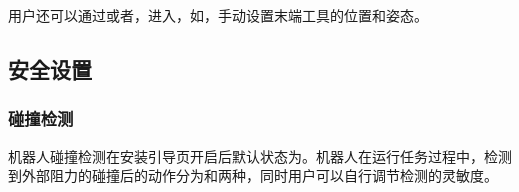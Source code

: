 用户还可以通过或者，进入，如，手动设置末端工具的位置和姿态。

\subsection{安全设置}
\subsubsection{碰撞检测}
机器人碰撞检测在安装引导页开启后默认状态为。机器人在运行任务过程中，检测到外部阻力的碰撞后的动作分为和两种，同时用户可以自行调节检测的灵敏度。

\begin{figure}[htb]
	\centering
	\hfill
\end{figure}
